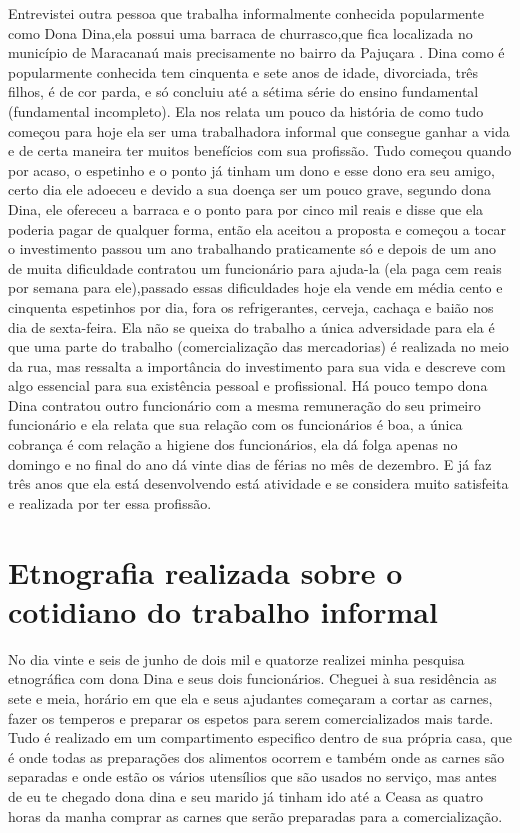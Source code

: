  Entrevistei outra pessoa que trabalha informalmente conhecida popularmente como 
Dona Dina,ela possui uma barraca de churrasco,que fica localizada no município 
de Maracanaú mais precisamente no bairro da Pajuçara . Dina como é popularmente 
conhecida tem cinquenta e sete anos de idade, divorciada, três filhos, é de cor 
parda, e só concluiu até a sétima série do ensino fundamental (fundamental 
incompleto). Ela nos relata um pouco da história de como tudo começou para hoje 
ela ser uma trabalhadora informal que consegue ganhar a vida e de certa maneira 
ter muitos benefícios com sua profissão. Tudo começou quando por acaso, o 
espetinho e o ponto já tinham um dono e esse dono era seu amigo, certo dia ele 
adoeceu e devido a sua doença ser um pouco grave, segundo dona Dina, ele 
ofereceu a barraca e o ponto para por cinco mil reais e disse que ela poderia 
pagar de qualquer forma, então ela aceitou a proposta e começou a tocar o 
investimento passou um ano trabalhando praticamente só e depois de um ano de 
muita dificuldade contratou um funcionário para ajuda-la (ela paga cem reais por 
semana para ele),passado essas dificuldades hoje ela vende em média cento e 
cinquenta espetinhos por dia, fora os refrigerantes, cerveja, cachaça e baião 
nos dia de sexta-feira. Ela não se queixa do trabalho a única adversidade para 
ela é que uma parte do trabalho (comercialização das mercadorias) é realizada no 
meio da rua, mas ressalta a importância do investimento para sua vida e descreve 
com algo essencial para sua existência pessoal e profissional. Há pouco tempo 
dona Dina contratou outro funcionário com a mesma remuneração do seu primeiro 
funcionário e ela relata que sua relação com os funcionários é boa, a única 
cobrança é com relação a higiene dos funcionários, ela dá folga apenas no 
domingo e no final do ano dá vinte dias de férias no mês de dezembro. E já faz 
três anos que ela está desenvolvendo está atividade e se considera muito 
satisfeita e realizada por ter essa profissão.

\section{Etnografia realizada sobre o cotidiano do trabalho informal}

No dia vinte e seis de junho de dois mil e quatorze realizei minha pesquisa 
etnográfica com dona Dina e seus dois funcionários. Cheguei à sua residência as 
sete e meia, horário em que ela e seus ajudantes começaram a cortar as carnes, 
fazer os temperos e preparar os espetos para serem comercializados mais tarde. 
Tudo é realizado em um compartimento especifico dentro de sua própria casa, que 
é onde todas as preparações dos alimentos ocorrem e também onde as carnes são 
separadas e onde estão os vários utensílios que são usados no serviço, mas antes 
de eu te chegado dona dina e seu marido já tinham ido até a Ceasa as quatro 
horas da manha comprar as carnes que serão preparadas para a comercialização. 

